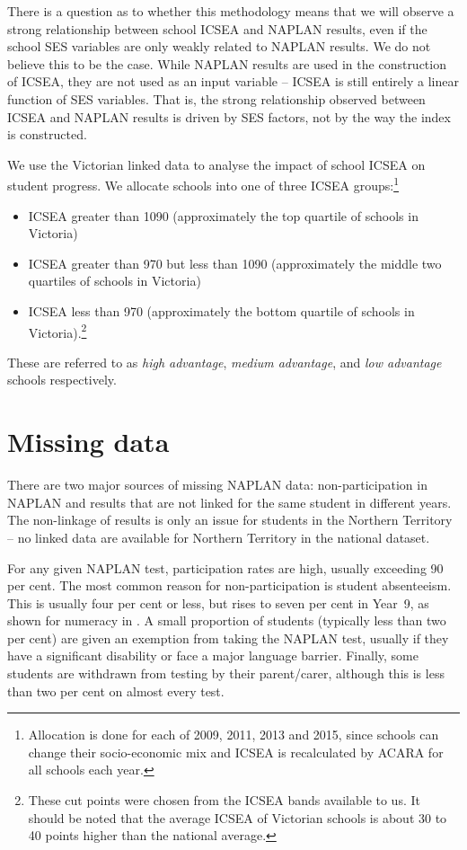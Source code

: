 There is a question as to whether this methodology means that we will observe a strong relationship between school ICSEA and NAPLAN results, even if the school SES variables are only weakly related to NAPLAN results. We do not believe this to be the case. While NAPLAN results are used in the construction of ICSEA, they are not used as an input variable -- ICSEA is still entirely a linear function of SES variables. That is, the strong relationship observed between ICSEA and NAPLAN results is driven by SES factors, not by the way the index is constructed.

We use the Victorian linked data to analyse the impact of school ICSEA on student progress. We allocate schools into one of three ICSEA groups:\footnote{Allocation is done for each of 2009, 2011, 2013 and 2015, since schools can change their socio-economic mix and ICSEA is recalculated by ACARA for all schools each year.}
\begin{itemize}
\item ICSEA greater than 1090 (approximately the top quartile of schools in Victoria)
\item ICSEA greater than 970 but less than 1090 (approximately the middle two quartiles of schools in Victoria) 
\item ICSEA less than 970 (approximately the bottom quartile of schools in Victoria).\footnote{These cut points were chosen from the ICSEA bands available to us. It should be noted that the average ICSEA of Victorian schools is about 30 to 40 points higher than the national average.}
\end{itemize}

These are referred to as \textit{high advantage}, \textit{medium advantage}, and \textit{low advantage} schools respectively. 

\section{Missing data} \label{sec:missing}

There are two major sources of missing NAPLAN data: non-participation in NAPLAN and results that are not linked for the same student in different years. The non-linkage of results is only an issue for students in the Northern Territory -- no linked data are available for Northern Territory in the national dataset.

For any given NAPLAN test, participation rates are high, usually exceeding 90 per cent. The most common reason for non-participation is student absenteeism. This is usually four per cent or less, but rises to seven per cent in \mbox{Year 9}, as shown for numeracy in . A small proportion of students (typically less than two per cent) are given an exemption from taking the NAPLAN test, usually if they have a significant disability or face a major language barrier. Finally, some students are withdrawn from testing by their parent/carer, although this is less than two per cent on almost every test.

